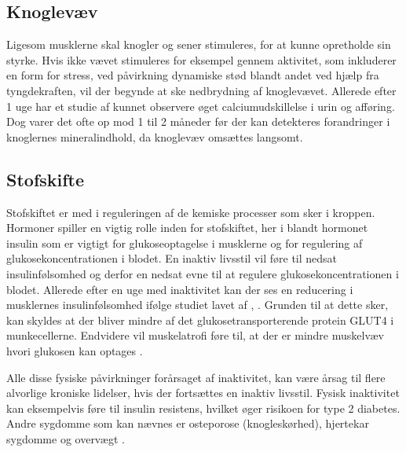 \subsection{Knoglevæv}
Ligesom musklerne skal knogler og sener stimuleres, for at kunne opretholde sin styrke. 
Hvis ikke vævet stimuleres for eksempel gennem aktivitet, som inkluderer en form for stress, ved påvirkning dynamiske stød blandt andet ved hjælp fra tyngdekraften, vil der begynde at ske nedbrydning af knoglevævet. 
Allerede efter 1 uge har et studie af \citeauthor{Bloomsfield1995} kunnet observere øget calciumudskillelse i urin og afføring. 
Dog varer det ofte op mod 1 til 2 måneder før der kan detekteres forandringer i knoglernes mineralindhold, da knoglevæv omsættes langsomt. \citep{Bloomfield1995}

\subsection{Stofskifte}
Stofskiftet er med i reguleringen af de kemiske processer som sker i kroppen. 
Hormoner spiller en vigtig rolle inden for stofskiftet, her i blandt hormonet insulin som er vigtigt for glukoseoptagelse i musklerne og for regulering af glukosekoncentrationen i blodet. 
En inaktiv livsstil vil føre til nedsat insulinfølsomhed og derfor en nedsat evne til at regulere glukosekoncentrationen i blodet. 
Allerede efter en uge med inaktivitet kan der ses en reducering i musklernes insulinfølsomhed ifølge studiet lavet af \citeauthor{Mikines1991}, \citep{Mikines1991}. 
Grunden til at dette sker, kan skyldes at der bliver mindre af det glukosetransporterende protein GLUT4 i munkecellerne. 
Endvidere vil muskelatrofi føre til, at der er mindre muskelvæv hvori glukosen kan optages \citep{Tabata1999}.

\noindent
Alle disse fysiske påvirkninger forårsaget af inaktivitet, kan være årsag til flere alvorlige kroniske lidelser, hvis der fortsættes en inaktiv livsstil. 
Fysisk inaktivitet kan eksempelvis føre til insulin resistens, hvilket øger risikoen for type 2 diabetes. 
Andre sygdomme som kan nævnes er osteporose (knogleskørhed), hjertekar sygdomme og overvægt \citep{motionsraad2007}.